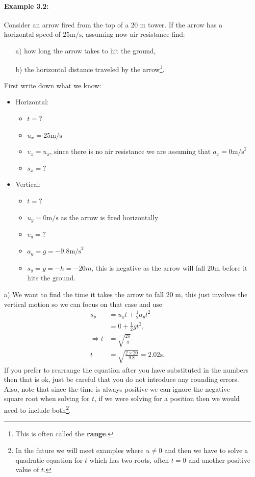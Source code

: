 \documentclass[a4paper,12pt]{book}
\begin{document}
\paragraph{Example 3.2:} Consider an arrow fired from the top of a 20 m tower. If the arrow has a horizontal speed of $25 \text{m/s}$, assuming now air resistance find:
\begin{itemize}
\setlength{\itemsep}{-5pt}
    \item[a)] how long the arrow takes to hit the ground,
    \item[b)] the horizontal distance traveled by the arrow\footnote{This is often called the \textbf{range}.}.
\end{itemize}


First write down what we know:

\begin{itemize}
\setlength{\itemsep}{-5pt}
    \item Horizontal:
\begin{itemize}
\setlength{\itemsep}{-5pt}
    \item $t=?$
\item $u_{x}=25\text{m/s}$
\item $v_{x}=u_{x}$, since there is no air resistance we are assuming that $a_{x}=0\text{m/s}^{2}$
\item $s_{x}=?$
\end{itemize}
    \item Vertical:
\begin{itemize}
\setlength{\itemsep}{-5pt}
    \item $t=?$
\item $u_{y}=0\text{m/s}$ as the arrow is fired horizontally
\item $v_{y}=?$
\item $a_{y}=g=-9.8\text{m/s}^{2}$
\item $s_{y}=y=-h=-20m$, this is negative as the arrow will fall $20$m before it hits the ground. 
\end{itemize}
\end{itemize}
a) We want to find the time it takes the arrow to fall $20$ m, this just involves the vertical motion so we can focus on that case and use 
\begin{align*}
s_{y}&=u_{y}t+\frac{1}{2}a_{y}t^{2}\\
&=0+\frac{1}{2}gt^{2},\\
\Rightarrow t&=\sqrt{\frac{2s}{g}}\\
t&=\sqrt{\frac{2\times 20}{9.8}}=2.02 \text{s}.
\end{align*}
If you prefer to rearrange the equation after you have substituted in the numbers then that is ok, just be careful that you do not introduce any rounding errors. Also, note that since the time is always positive we can ignore the negative square root when solving for $t$, if we were solving for a position then we would need to include both\footnote{In the future we will meet examples where $u\neq 0$ and then we have to solve a quadratic equation for $t$ which has two roots, often $t=0$ and another positive value of $t$. }.\\
\end{document}
